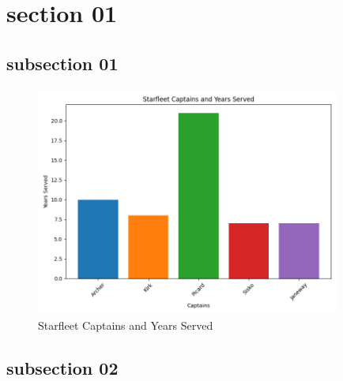 \documentclass[class=book, crop=false]{standalone}
\begin{document}
\section{section 01}
\subsection{subsection 01}

\paragraph*{}
\blindtext

\begin{figure}[htbp]
    \centering
    \includegraphics[width=10cm]{src/contents/figures_and_plots/plots/captains_and_years_served.png}
    \caption{Starfleet Captains and Years Served}
    \label{fig:captains}
\end{figure}

\paragraph*{}
\blindmathpaper\cite{knuth:1984}

\subsection{subsection 02}

\paragraph*{}
\blindtext
\end{document}
